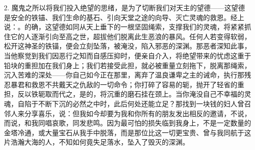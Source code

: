 2. 魔鬼之所以将我们投入绝望的思绪，是为了切断我们对天主的望德——这望德是安全的铁锚、我们生命的基石、引向天堂之途的向导、灭亡灵魂的救恩。经上说：。的确，这望德如同从天上垂下的一根坚固绳索，支撑我们的灵魂，将紧紧抓住它的人逐渐引向至高之世，超拔他们脱离此生恶浪的暴风。任何人若变得软弱，松开这神圣的铁锚，便会立刻坠落，被淹没，陷入邪恶的深渊。那恶者深知此事，当他察觉到我们因恶行之知而自感压抑时，便亲自介入，将绝望带来的忧虑这重于铅块的重担加在我们身上；我们若接受此担，就必被重量立刻拖下，脱离那绳索，沉入苦难的深处——你自己如今正在那里，离弃了温良谦卑之主的诫命，执行那残忍暴君和救恩不共戴天之仇敌的一切命令；你打碎了容易的轭，抛开了轻省的重担，反以铁轭取而代之，是的，将沉重的磨石挂在颈上。当你淹没自己不幸福的灵魂，自陷于不断下沉的必然之中时，此后何处还能立足？那找到一块钱的妇人曾召邻人来分享喜乐，说：但我如今却要为我和你所有的朋友发出相反的邀请，不说，而说，和我同唱哀歌，同发悲鸣。因为最可怕的损失临到我身上，不是一定数量的金塔冷通，或大量宝石从我手中脱落，而是那位比这一切更宝贵、曾与我同航于这片浩瀚大海的人，不知如何竟失足落水，坠入了毁灭的深渊。\par

